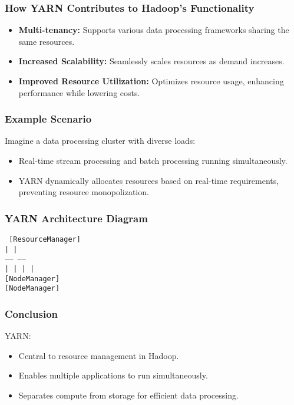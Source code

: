 \documentclass{beamer}
\begin{document}
\begin{frame}[fragile]
    \frametitle{How YARN Contributes to Hadoop's Functionality}
    \begin{itemize}
        \item \textbf{Multi-tenancy:} Supports various data processing frameworks sharing the same resources.
        \item \textbf{Increased Scalability:} Seamlessly scales resources as demand increases.
        \item \textbf{Improved Resource Utilization:} Optimizes resource usage, enhancing performance while lowering costs.
    \end{itemize}
\end{frame}

\begin{frame}[fragile]
    \frametitle{Example Scenario}
    Imagine a data processing cluster with diverse loads:
    \begin{itemize}
        \item Real-time stream processing and batch processing running simultaneously.
        \item YARN dynamically allocates resources based on real-time requirements, preventing resource monopolization.
    \end{itemize}
\end{frame}

\begin{frame}[fragile]
    \frametitle{YARN Architecture Diagram}
    \begin{center}
        \texttt{
        [ResourceManager] \\
                |                       | \\
             ------                ------ \\
             |    |                 |    | \\
        [NodeManager]       [NodeManager] \\
        [NodeManager]       [NodeManager]
        }
    \end{center}
\end{frame}

\begin{frame}[fragile]
    \frametitle{Conclusion}
    YARN:
    \begin{itemize}
        \item Central to resource management in Hadoop.
        \item Enables multiple applications to run simultaneously.
        \item Separates compute from storage for efficient data processing.
    \end{itemize}
\end{frame}
\end{document}
